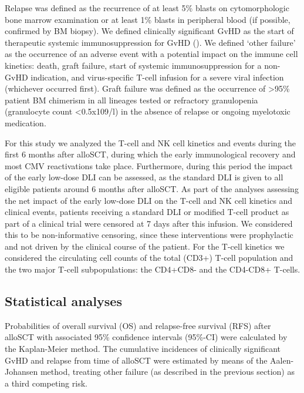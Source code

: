 \documentclass[
  letterpaper,
  DIV=11,
  numbers=noendperiod]{scrreprt}
\begin{document}
Relapse was defined as the recurrence of at least 5\% blasts on
cytomorphologic bone marrow examination or at least 1\% blasts in
peripheral blood (if possible, confirmed by BM biopsy). We defined
clinically significant GvHD as the start of therapeutic systemic
immunosuppression for GvHD
(). We defined `other failure' as the occurrence of
an adverse event with a potential impact on the immune cell kinetics:
death, graft failure, start of systemic immunosuppression for a non-GvHD
indication, and virus-specific T-cell infusion for a severe viral
infection (whichever occurred first). Graft failure was defined as the
occurrence of \textgreater95\% patient BM chimerism in all lineages
tested or refractory granulopenia (granulocyte count \textless0.5x109/l)
in the absence of relapse or ongoing myelotoxic medication.

For this study we analyzed the T-cell and NK cell kinetics and events
during the first 6 months after alloSCT, during which the early
immunological recovery and most CMV reactivations take place.
Furthermore, during this period the impact of the early low-dose DLI can
be assessed, as the standard DLI is given to all eligible patients
around 6 months after alloSCT. As part of the analyses assessing the net
impact of the early low-dose DLI on the T-cell and NK cell kinetics and
clinical events, patients receiving a standard DLI or modified T-cell
product as part of a clinical trial were censored at 7 days after this
infusion. We considered this to be non-informative censoring, since
these interventions were prophylactic and not driven by the clinical
course of the patient. For the T-cell kinetics we considered the
circulating cell counts of the total (CD3+) T-cell population and the
two major T-cell subpopulations: the CD4+CD8- and the CD4-CD8+ T-cells.

\subsection{Statistical analyses}\label{statistical-analyses}

Probabilities of overall survival (OS) and relapse-free survival (RFS)
after alloSCT with associated 95\% confidence intervals (95\%-CI) were
calculated by the Kaplan-Meier method. The cumulative incidences of
clinically significant GvHD and relapse from time of alloSCT were
estimated by means of the Aalen-Johansen method, treating other failure
(as described in the previous section) as a third competing risk.
\end{document}
